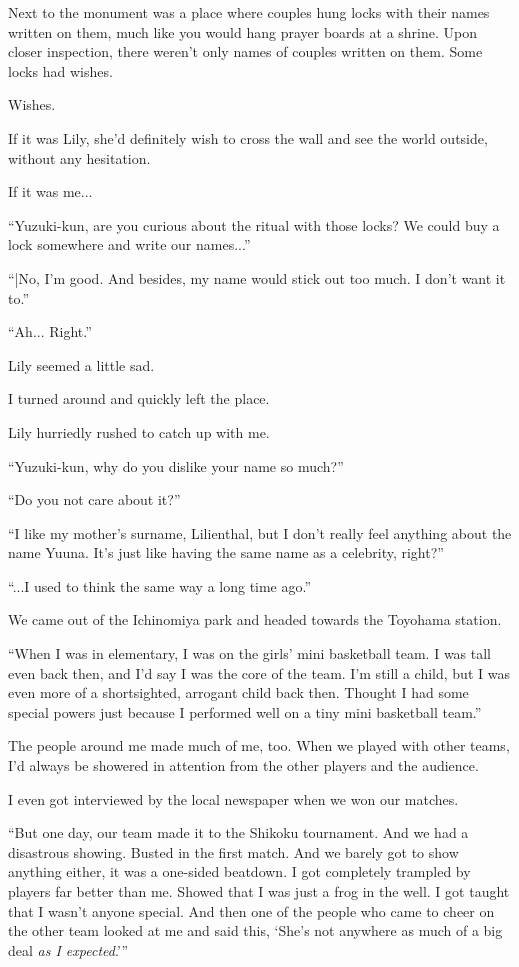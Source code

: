 Next to the monument was a place where couples hung locks with their names written on them, much like you would hang prayer boards at a shrine. Upon closer inspection, there weren't only names of couples written on them. Some locks had wishes.

Wishes.

If it was Lily, she'd definitely wish to cross the wall and see the world outside, without any hesitation.

If it was me...

``Yuzuki-kun, are you curious about the ritual with those locks? We could buy a lock somewhere and write our names...''

``|No, I'm good. And besides, my name would stick out too much. I don't want it to.''

``Ah... Right.''

Lily seemed a little sad.

I turned around and quickly left the place.

Lily hurriedly rushed to catch up with me.

``Yuzuki-kun, why do you dislike your name so much?''

``Do you not care about it?''

``I like my mother's surname, Lilienthal, but I don't really feel anything about the name Yuuna. It's just like having the same name as a celebrity, right?''

``...I used to think the same way a long time ago.''

We came out of the Ichinomiya park and headed towards the Toyohama station.

``When I was in elementary, I was on the girls' mini basketball team. I was tall even back then, and I'd say I was the core of the team. I'm still a child, but I was even more of a shortsighted, arrogant child back then. Thought I had some special powers just because I performed well on a tiny mini basketball team.''

The people around me made much of me, too. When we played with other teams, I'd always be showered in attention from the other players and the audience.

I even got interviewed by the local newspaper when we won our matches.

``But one day, our team made it to the Shikoku tournament. And we had a disastrous showing. Busted in the first match. And we barely got to show anything either, it was a one-sided beatdown. I got completely trampled by players far better than me. Showed that I was just a frog in the well. I got taught that I wasn't anyone special. And then one of the people who came to cheer on the other team looked at me and said this, `She's not anywhere as much of a big deal \textit{as I expected}.'\thinspace''

